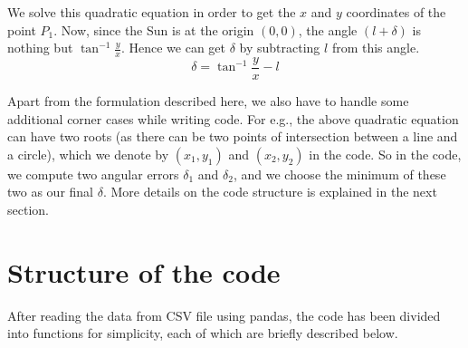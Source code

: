 \documentclass[11pt]{article}
\begin{document}
We solve this quadratic equation in order to get the $x$ and $y$ coordinates of the point $P_1$. Now, since the Sun is at the origin $(0, 0)$, the angle $(l + \delta)$ is nothing but $\tan^{-1}{\frac{y}{x}}$. Hence we can get $\delta$ by subtracting $l$ from this angle.
\begin{equation*}
    \delta = \tan^{-1}{\frac{y}{x}} - l
\end{equation*}

Apart from the formulation described here, we also have to handle some additional corner cases while writing code. For e.g., the above quadratic equation can have two roots (as there can be two points of intersection between a line and a circle), which we denote by $(x_1, y_1)$ and $(x_2, y_2)$ in the code. So in the code, we compute two angular errors $\delta_1$ and $\delta_2$, and we choose the minimum of these two as our final $\delta$. More details on the code structure is explained in the next section.

\section{Structure of the code}\label{section-code}

After reading the data from CSV file using pandas, the code has been divided into functions for simplicity, each of which are briefly described below. 
\end{document}
